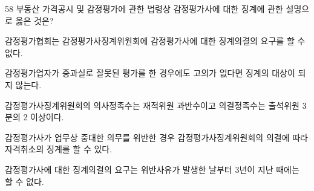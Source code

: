 \begin{question}{58}
부동산 가격공시 및 감정평가에 관한 법령상 감정평가사에 대한 징계에 관한 설명으로 옳은 것은?
\begin{choices}
  \item 감정평가협회는 감정평가사징계위원회에 감정평가사에 대한 징계의결의 요구를 할 수 없다.
  \item 감정평가업자가 중과실로 잘못된 평가를 한 경우에도 고의가 없다면 징계의 대상이 되지 않는다.
  \item 감정평가사징계위원회의 의사정족수는 재적위원 과반수이고 의결정족수는 출석위원 3분의 2 이상이다.
  \item 감정평가사가 업무상 중대한 의무를 위반한 경우 감정평가사징계위원회의 의결에 따라 자격취소의 징계를 할 수 있다.
  \item 감정평가사에 대한 징계의결의 요구는 위반사유가 발생한 날부터 3년이 지난 때에는 할 수 없다.
\end{choices}
\end{question}
